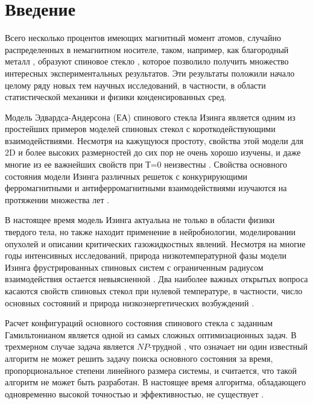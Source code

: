 \documentclass[utf8, babel, sor, jor, amsmath, amssymb, reprint]{elsarticle} %
\begin{document}
\newpage
\section{Введение}

Всего несколько процентов имеющих магнитный момент атомов, случайно распределенных в немагнитном носителе, таком, например, как благородный металл  \cite{finkler1989spin}, образуют спиновое стекло \cite{belokon2006spin}, которое позволило получить множество интересных экспериментальных результатов. Эти результаты положили начало целому ряду новых тем научных исследований, в частности, в области статистической механики и физики конденсированных сред.

Модель Эдвардса-Андерсона (ЕА) спинового стекла Изинга является одним из простейших примеров моделей спиновых стекол с короткодействующими взаимодействиями. Несмотря на кажущуюся простоту, свойства этой модели для 2D и более высоких размерностей до сих пор не очень хорошо изучены, и даже многие из ее важнейших свойств при Т=0 неизвестны \cite{pal1996ground}. Свойства основного состояния модели Изинга различных решеток с конкурирующими ферромагнитными и антиферромагнитными взаимодействиями изучаются на протяжении множества лет \cite{lebrecht2004plaquette, valdes2012j, lebrecht2015j}. 

В настоящее время модель Изинга актуальна не только в области физики твердого тела, но также находит применение в нейробиологии, моделировании опухолей и описании критических газожидкостных явлений. Несмотря на многие годы интенсивных исследований, природа низкотемпературной фазы модели Изинга фрустрированных спиновых систем с ограниченным радиусом взаимодействия остается невыясненной \cite{newman2023proof}. Два наиболее важных открытых вопроса касаются свойств спиновых стекол при нулевой температуре, в частности, число основных состояний и природа низкоэнергетических возбуждений \cite{newman2022ground}.  

Расчет конфигураций основного состояния спинового стекла с заданным Гамильтонианом является одной из самых сложных оптимизационных задач. В трехмерном случае задача является $NP$-трудной \cite{barahona1982computational, hartmann2002optimization}, что означает ни один известный алгоритм не может решить задачу поиска основного состояния за время, пропорциональное степени линейного размера системы, и считается, что такой алгоритм не может быть разработан. В настоящее время алгоритма, обладающего одновременно высокой точностью и эффективностью, не существует \cite{fan2023searching}.
\end{document}
